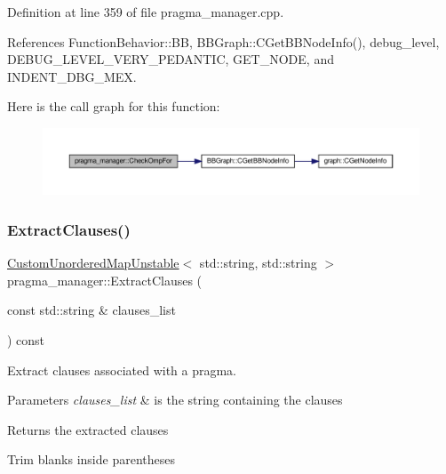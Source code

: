 Definition at line 359 of file pragma\+\_\+manager.\+cpp.



References Function\+Behavior\+::\+BB, B\+B\+Graph\+::\+C\+Get\+B\+B\+Node\+Info(), debug\+\_\+level, D\+E\+B\+U\+G\+\_\+\+L\+E\+V\+E\+L\+\_\+\+V\+E\+R\+Y\+\_\+\+P\+E\+D\+A\+N\+T\+IC, G\+E\+T\+\_\+\+N\+O\+DE, and I\+N\+D\+E\+N\+T\+\_\+\+D\+B\+G\+\_\+\+M\+EX.

Here is the call graph for this function\+:
\nopagebreak
\begin{figure}[H]
\begin{center}
\leavevmode
\includegraphics[width=350pt]{d2/d1d/classpragma__manager_ab11210292e6fd579b9d7e329a0de1bab_cgraph}
\end{center}
\end{figure}
\mbox{\label{classpragma__manager_a5e065372e3faa9eac004888ad14c95f4}} 
\subsubsection{\texorpdfstring{Extract\+Clauses()}{ExtractClauses()}}
{\footnotesize\ttfamily \hyperlink{custom__map_8hpp_a8cbaceffc09790a885ec7e9c17809c69}{Custom\+Unordered\+Map\+Unstable}$<$ std\+::string, std\+::string $>$ pragma\+\_\+manager\+::\+Extract\+Clauses (\begin{DoxyParamCaption}\item[{const std\+::string \&}]{clauses\+\_\+list }\end{DoxyParamCaption}) const}



Extract clauses associated with a pragma. 


\begin{DoxyParams}{Parameters}
{\em clauses\+\_\+list} & is the string containing the clauses \\
\hline
\end{DoxyParams}
\begin{DoxyReturn}{Returns}
the extracted clauses 
\end{DoxyReturn}
Trim blanks inside parentheses 

